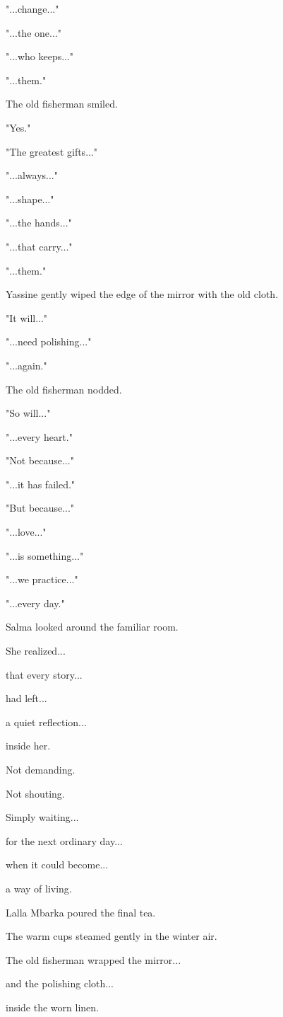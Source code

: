 \documentclass[12pt,openany]{book}
\begin{document}
"...change..."

"...the one..."

"...who keeps..."

"...them."

The old fisherman smiled.

"Yes."

"The greatest gifts..."

"...always..."

"...shape..."

"...the hands..."

"...that carry..."

"...them."

Yassine gently wiped the edge of the mirror with the old cloth.

"It will..."

"...need polishing..."

"...again."

The old fisherman nodded.

"So will..."

"...every heart."

"Not because..."

"...it has failed."

"But because..."

"...love..."

"...is something..."

"...we practice..."

"...every day."

Salma looked around the familiar room.

She realized...

that every story...

had left...

a quiet reflection...

inside her.

Not demanding.

Not shouting.

Simply waiting...

for the next ordinary day...

when it could become...

a way of living.

Lalla Mbarka poured the final tea.

The warm cups steamed gently in the winter air.

The old fisherman wrapped the mirror...

and the polishing cloth...

inside the worn linen.
\end{document}
